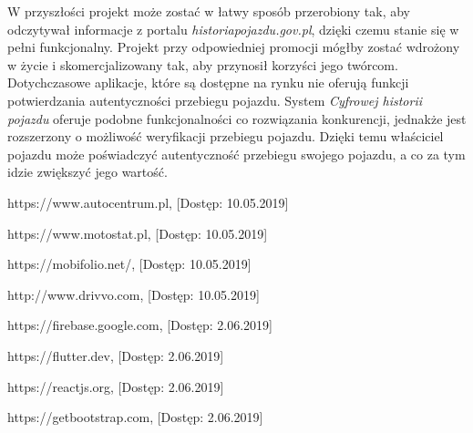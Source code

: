 \documentclass[12pt]{article}
\begin{document}
W przyszłości projekt może zostać w łatwy sposób przerobiony tak, aby odczytywał informacje z portalu \textit{historiapojazdu.gov.pl}, dzięki czemu stanie się w pełni funkcjonalny. Projekt przy odpowiedniej promocji mógłby zostać wdrożony w życie i skomercjalizowany tak, aby przynosił korzyści jego twórcom. Dotychczasowe aplikacje, które są dostępne na rynku nie oferują funkcji potwierdzania autentyczności przebiegu pojazdu. System \textit{Cyfrowej historii pojazdu} oferuje podobne funkcjonalności co rozwiązania konkurencji, jednakże jest rozszerzony o możliwość weryfikacji przebiegu pojazdu. Dzięki temu właściciel pojazdu może poświadczyć autentyczność przebiegu swojego pojazdu, a co za tym idzie zwiększyć jego wartość.


\newpage
\renewcommand\refname{Bibliografia}
\begin{thebibliography}{9}

  https://www.autocentrum.pl, [Dostęp: 10.05.2019]

  https://www.motostat.pl, [Dostęp: 10.05.2019]

 https://mobifolio.net/, [Dostęp: 10.05.2019]

  http://www.drivvo.com, [Dostęp: 10.05.2019]

  https://firebase.google.com, [Dostęp: 2.06.2019]

  https://flutter.dev, [Dostęp: 2.06.2019]

  https://reactjs.org, [Dostęp: 2.06.2019]

  https://getbootstrap.com, [Dostęp: 2.06.2019]
\end{thebibliography}
\end{document}
